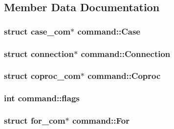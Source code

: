 \subsection{Member Data Documentation}
\subsubsection[{\texorpdfstring{Case}{Case}}]{\setlength{\rightskip}{0pt plus 5cm}struct {\bf case\+\_\+com}$\ast$ command\+::\+Case}\hypertarget{structcommand_a3b14b45192764ae24f9c40edf7aefc94}{}\label{structcommand_a3b14b45192764ae24f9c40edf7aefc94}
\subsubsection[{\texorpdfstring{Connection}{Connection}}]{\setlength{\rightskip}{0pt plus 5cm}struct {\bf connection}$\ast$ command\+::\+Connection}\hypertarget{structcommand_a2d2ed612574d67c6d3d83892595563f5}{}\label{structcommand_a2d2ed612574d67c6d3d83892595563f5}
\subsubsection[{\texorpdfstring{Coproc}{Coproc}}]{\setlength{\rightskip}{0pt plus 5cm}struct {\bf coproc\+\_\+com}$\ast$ command\+::\+Coproc}\hypertarget{structcommand_a2b7939e2744dc3a05722a9982148b219}{}\label{structcommand_a2b7939e2744dc3a05722a9982148b219}
\subsubsection[{\texorpdfstring{flags}{flags}}]{\setlength{\rightskip}{0pt plus 5cm}int command\+::flags}\hypertarget{structcommand_aa901bebf4c7f683f6934e69ad95f2b11}{}\label{structcommand_aa901bebf4c7f683f6934e69ad95f2b11}
\subsubsection[{\texorpdfstring{For}{For}}]{\setlength{\rightskip}{0pt plus 5cm}struct {\bf for\+\_\+com}$\ast$ command\+::\+For}\hypertarget{structcommand_a7b937c91d8eacc73c93c1cf64422dc28}{}\label{structcommand_a7b937c91d8eacc73c93c1cf64422dc28}

